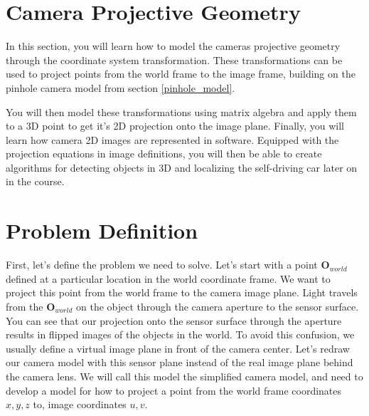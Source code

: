 \section{Camera Projective Geometry}
\label{camera_projective_geometry}

In this section, you will learn how to model the cameras projective geometry through the coordinate
system transformation. These transformations can
be used to project points from the world frame
to the image frame, building on the pinhole
camera model from section \ref{pinhole_model}.

You will then model
these transformations using matrix algebra and apply them to a 3D point to get it's 2D projection
onto the image plane. Finally, you will learn how camera 2D images are
represented in software. Equipped with the projection equations in image definitions, 
you will then be able to create algorithms for detecting objects in 3D and localizing
the self-driving car later on in the course. 

\section{Problem Definition}

First, let's define
the problem we need to solve. Let's start with a
point $\mathbf{O}_{world}$ defined at a particular location in
the world coordinate frame. We want to project
this point from the world frame to
the camera image plane. Light travels from
the $\mathbf{O}_{world}$ on the object through the camera aperture
to the sensor surface. You can see that our projection onto the sensor surface through the aperture results in flipped images of
the objects in the world. To avoid this confusion, we usually define
a virtual image plane in front of the camera center. Let's redraw our camera model
with this sensor plane instead of the real image
plane behind the camera lens. We will call this model the
simplified camera model, and need to develop
a model for how to project a point from the world
frame coordinates $x, y, z$ to, image coordinates $u, v$. 

